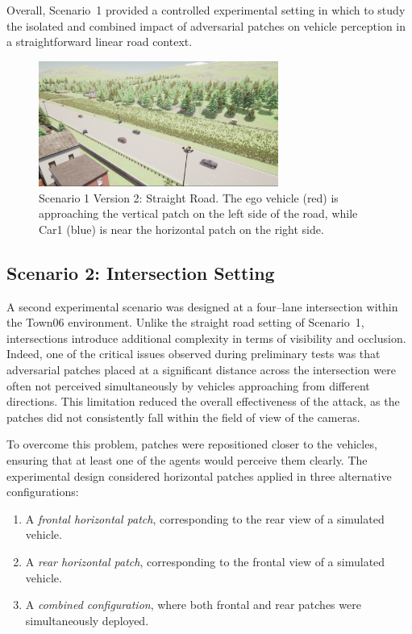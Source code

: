 Overall, Scenario~1 provided a controlled experimental setting in which to study the isolated and combined impact of adversarial patches on vehicle perception in a straightforward linear road context.

\begin{figure}
    \centering
    \includegraphics[width=0.7\textwidth]{figures/experiments/scenario1_v2.png}
    \caption{Scenario 1 Version 2: Straight Road. The ego vehicle (red) is approaching the vertical patch on the left side of the road, while Car1 (blue) is near the horizontal patch on the right side.}
    \label{fig:scenario_straight_road_v2}
\end{figure}

\subsection{Scenario 2: Intersection Setting}

A second experimental scenario was designed at a four–lane intersection within the Town06 environment.  
Unlike the straight road setting of Scenario~1, intersections introduce additional complexity in terms of visibility and occlusion. Indeed, one of the critical issues observed during preliminary tests was that adversarial patches placed at a significant distance across the intersection were often not perceived simultaneously by vehicles approaching from different directions. This limitation reduced the overall effectiveness of the attack, as the patches did not consistently fall within the field of view of the cameras.  

To overcome this problem, patches were repositioned closer to the vehicles, ensuring that at least one of the agents would perceive them clearly. The experimental design considered horizontal patches applied in three alternative configurations:  
\begin{enumerate}
    \item A \textit{frontal horizontal patch}, corresponding to the rear view of a simulated vehicle.  
    \item A \textit{rear horizontal patch}, corresponding to the frontal view of a simulated vehicle.  
    \item A \textit{combined configuration}, where both frontal and rear patches were simultaneously deployed.  
\end{enumerate}

